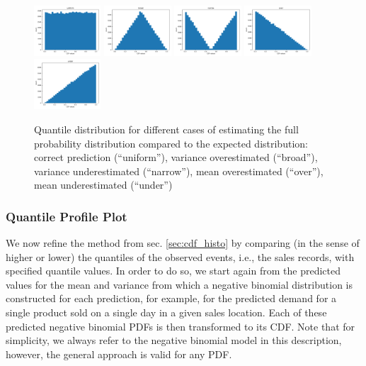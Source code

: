 \documentclass[BCOR=1mm, DIV=calc,10pt,
twoside=true,
twocolumn,
headings=normal]{scrartcl}
\begin{document}
\begin{figure}
\begin{center}
\includegraphics[width=2.5cm]{../figures/cdf_truth_uniform}
\includegraphics[width=2.5cm]{../figures/cdf_truth_broad}
\includegraphics[width=2.5cm]{../figures/cdf_truth_narrow}
\includegraphics[width=2.5cm]{../figures/cdf_truth_over}
\includegraphics[width=2.5cm]{../figures/cdf_truth_under}
\caption{\label{fig:cdf_histos} Quantile distribution for different cases of estimating the full probability distribution compared to the expected distribution:
correct prediction (``uniform''), variance overestimated (``broad''), variance underestimated (``narrow''), mean overestimated (``over''), mean underestimated (``under'')}
\end{center}
\end{figure}

\subsubsection{Quantile Profile Plot}

We now refine the method from sec. \ref{sec:cdf_histo} by comparing (in the sense of higher or lower) the quantiles of the observed events, i.e., the sales records, with specified quantile values. In order to do so, we start again from the predicted values for the mean and variance from which a negative binomial distribution is constructed for each prediction, for example, for the predicted demand for a single product sold on a single day in a given sales location. Each of these predicted negative binomial PDFs is then transformed to its CDF. Note that for simplicity, we always refer to the negative binomial model in this description, however, the general approach is valid for any PDF.
\end{document}
